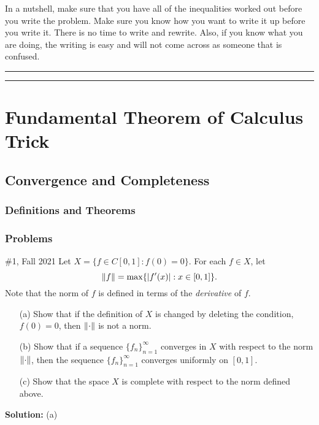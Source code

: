 \documentclass{article}
\begin{document}
In a nutshell, make sure that you have all of the inequalities worked out before you write the problem. Make sure you know how you want to write it up before you write it. There is no time to write and rewrite. Also, if you know what you are doing, the writing is easy and will not come across as someone that is confused.\\

\hrule \vspace{2pt}
\hrule 

\break

\section{Fundamental Theorem of Calculus Trick}

\subsection{Convergence and Completeness}

\subsubsection{Definitions and Theorems}

\subsubsection{Problems}

\begin{problem}{\#1, Fall 2021} Let $X = \{f \in C[0,1] : f(0) = 0\}$. For each $f\in X$, let 
	\[\left\lVert { f } \right\rVert = \max\{ |f'(x)| : x\in [0,1]\}.\]
Note that the norm of $f$ is defined in terms of the \textit{derivative} of $f$. 
\begin{enumerate}
	\item[(a)] Show that if the definition of $X$ is changed by deleting the condition, $f(0) = 0$, 
		then $\left\lVert {\cdot} \right\rVert$ is not a norm. 
	\item[(b)] Show that if a sequence $\{f_n\}_{n=1}^\infty$ converges in $X$ with respect to the norm $\left\lVert {\cdot} \right\rVert$,
		then the sequence $\{f_n\}_{n=1}^\infty$ converges uniformly on $[0,1]$.
	\item[(c)] Show that the space $X$ is complete with respect to the norm defined above.
\end{enumerate}

\end{problem}

\textbf{Solution:} (a) 
\end{document}
